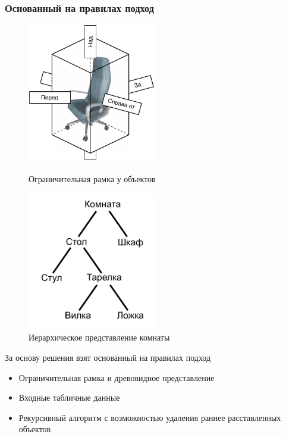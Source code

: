 \documentclass{beamer}
\begin{document}
\begin{frame}
  \frametitle{Основанный на правилах подход}
    \begin{figure}
      \centering
      \begin{minipage}{0.45\textwidth}
        \centering
        \includegraphics[width=0.5\textwidth]{pictures/collider.pdf}
        \caption{Ограничительная рамка у объектов}
      \end{minipage}
      \hfill
      \begin{minipage}{0.45\textwidth}
        \centering
        \includegraphics[width=0.5\textwidth]{pictures/child_parent_relationship.pdf}
        \caption{Иерархическое представление комнаты}
      \end{minipage}
  \end{figure}
  За основу решения взят основанный на правилах подход
  \begin{itemize}
    \item Ограничительная рамка и древовидное представление
    \item Входные табличные данные
    \item Рекурсивный алгоритм с возможностью удаления раннее расставленных объектов
  \end{itemize}
\end{frame}
\end{document}
